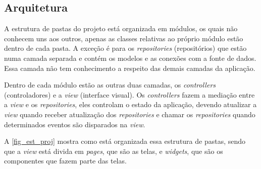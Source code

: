\subsection{Arquitetura}

A estrutura de pastas do projeto está organizada em módulos, os quais não conhecem uns aos outros,
apenas as classes relativas ao próprio módulo estão dentro de cada pasta. A exceção é para os \emph{repositories} (repositórios)
que estão numa camada separada e contém os modelos e as conexões com a fonte de dados.
Essa camada não tem conhecimento a respeito das demais camadas da aplicação.

Dentro de cada módulo estão as outras duas camadas, os \emph{controllers} (controladores) e a \emph{view} (interface visual).
Os \emph{controllers} fazem a mediação entre a \emph{view} e os \emph{repositories}, eles controlam o estado da aplicação,
devendo atualizar a \emph{view} quando receber atualização dos \emph{repositories} e chamar os \emph{repositories}
quando determinados eventos são disparados na \emph{view}.

A \autoref{fig_est_proj} mostra como está organizada essa estrutura de pastas, sendo que a \emph{view}
está divida em \emph{pages}, que são as telas, e \emph{widgets}, que são os componentes que fazem parte das telas.

\newpage

